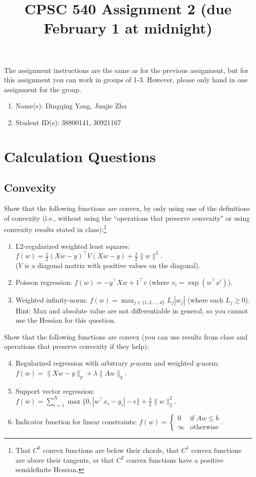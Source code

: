 \documentclass{article}
\def\blu#1{{\color{blu}#1}}
\def\red#1{{\color{red}#1}}
\def\norm#1{\|#1\|}
\def\half{\frac 1 2}
\def\enum#1{\begin{enumerate}#1\end{enumerate}}
\begin{document}
\title{CPSC 540 Assignment 2 (due February 1 at midnight)}
\author{}
\date{}
\maketitle
\vspace{-4em}

The assignment instructions are the same as for the previous assignment, but for this assignment you can work in groups of 1-3. However, please only hand in one assignment for the group.


\blu{\enum{
\item Name(s): Dingqing Yang, Junjie Zhu
\item Student ID(s): 38800141, 30921167
}}




\section{Calculation Questions}


\subsection{Convexity}

\blu{Show that the following functions are convex, by only using one of the definitions of convexity (i.e., without using the ``operations that preserve convexity" or using convexity results stated in class)}:\footnote{That $C^0$ convex functions are below their chords, that $C^1$ convex functions are above their tangents, or that $C^2$ convex functions have a positive semidefinite Hessian.}
\enum{
\item L2-regularized weighted least squares: $f(w) = \half(Xw - y)^\top V(Xw-y)  + \frac \lambda 2 \norm{w}^2$.\\($V$ is a diagonal matrix with positive values on the diagonal).
\item Poisson regression: $f(w) = -y^\top Xw + 1^\top v$ (where $v_i = \exp(w^\top x^i)$).
\item Weighted infinity-norm: $f(w) = \max_{j \in \{1,2,\dots,d\}}L_j|w_j|$ \red{(where each $L_j \geq 0$)}.\\
Hint: Max and absolute value are not differentiable in general, so you cannot use the Hessian for this question.
}

\blu{Show that the following functions are convex (you can use results from class and operations that preserve convexity if they help)}:
\enum{
\setcounter{enumi}{3}
\item Regularized regression with arbitrary $p$-norm and weighted $q$-norm: $f(w) = \norm{Xw - y}_p + \lambda\norm{Aw}_q$.
\item Support vector regression: $f(w) = \sum_{i=1}^N\max\{0, |w^\top x_i - y_i| - \epsilon\} + \frac{\lambda}{2}\norm{w}_2^2$.
\item Indicator function for linear constraints: $f(w) = \begin{cases}0 & \text{if $Aw \leq b$}\\\infty & \text{otherwise}\end{cases}$.
}
\end{document}
